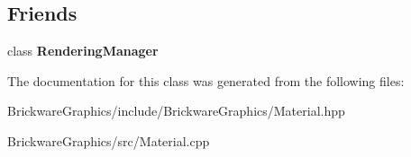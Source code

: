 \subsection*{Friends}
\begin{DoxyCompactItemize}
\item 
\hypertarget{classBrickware_1_1Graphics_1_1Material_af97d60083cbec9dff36ea5566c308d6d}{}class {\bfseries Rendering\+Manager}\label{classBrickware_1_1Graphics_1_1Material_af97d60083cbec9dff36ea5566c308d6d}

\end{DoxyCompactItemize}


The documentation for this class was generated from the following files\+:\begin{DoxyCompactItemize}
\item 
Brickware\+Graphics/include/\+Brickware\+Graphics/Material.\+hpp\item 
Brickware\+Graphics/src/Material.\+cpp\end{DoxyCompactItemize}
